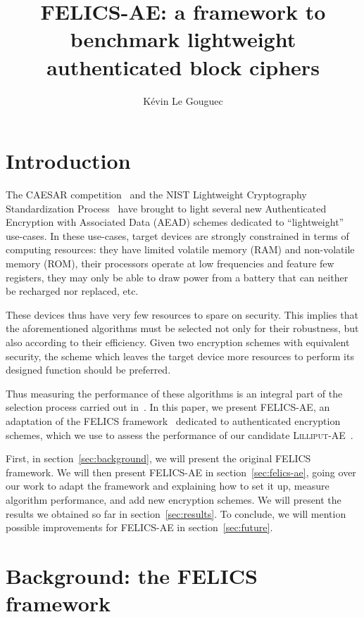 \documentclass{article}
\title{
  FELICS-AE: a framework to benchmark lightweight authenticated block ciphers
}
\author[*]{Kévin Le Gouguec}
\affil[*]{
  Airbus CyberSecurity -
  ZA Clef Saint-Pierre,
  1 Bd Jean Moulin,
  CS 40001,
  MetaPole,
  78996 ÉLANCOURT Cedex -
  France -
  \href{mailto:kevin.legouguec@airbus.com}{kevin.legouguec@airbus.com}
}
\begin{document}
\maketitle

\section{Introduction}
\label{sec:intro}

The CAESAR competition~\cite{CAESAR:submissions} and the NIST
Lightweight Cryptography Standardization Process~\cite{NIST:LWC} have
brought to light several new Authenticated Encryption with Associated
Data (AEAD) schemes dedicated to ``lightweight'' use-cases.  In these
use-cases, target devices are strongly constrained in terms of
computing resources: they have limited volatile memory (RAM) and
non-volatile memory (ROM), their processors operate at low frequencies
and feature few registers, they may only be able to draw power from a
battery that can neither be recharged nor replaced, etc.

These devices thus have very few resources to spare on security.  This
implies that the aforementioned algorithms must be selected not only
for their robustness, but also according to their efficiency.  Given
two encryption schemes with equivalent security, the scheme which
leaves the target device more resources to perform its designed
function should be preferred.

Thus measuring the performance of these algorithms is an integral part
of the selection process carried out in~\cite{NIST:LWC}.  In this
paper, we present FELICS-AE, an adaptation of the FELICS
framework~\cite{FELICS:paper} dedicated to authenticated encryption
schemes, which we use to assess the performance of our candidate
\textsc{Lilliput-AE}~\cite{NIST:Lilliput-AE}.

First, in section~\ref{sec:background}, we will present the original
FELICS framework.  We will then present FELICS-AE in
section~\ref{sec:felics-ae}, going over our work to adapt the
framework and explaining how to set it up, measure algorithm
performance, and add new encryption schemes.  We will present the
results we obtained so far in section~\ref{sec:results}.  To conclude,
we will mention possible improvements for FELICS-AE in
section~\ref{sec:future}.

\section{Background: the FELICS framework}
\label{sec:felics}
\end{document}
